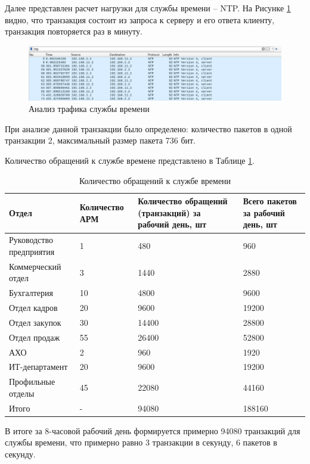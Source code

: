\documentclass[14pt, a4paper]{extarticle}
\numberwithin{equation}{section}
\begin{document}
Далее представлен расчет нагрузки для службы времени -- NTP. На Рисунке \ref{fig:wireshark_ntp_dump} видно, что
транзакция состоит из запроса к серверу и его ответа клиенту, транзакция повторяется
раз в минуту.

\begin{figure}[H]
        \centering
        \includegraphics[scale=0.5]{ntp_wireshark_dump.png}
        \caption{Анализ трафика службы времени}
        \label{fig:wireshark_ntp_dump}
\end{figure}

При анализе данной транзакции было определено: количество пакетов в одной транзакции 2, максимальный размер пакета 736 бит.

Количество обращений к службе времене представлено в Таблице \ref{table:ntp_requests}.
\begin{table}[H]
\centering
\small
\caption{Количество обращений к службе времени}
\label{table:ntp_requests}
\begin{tabular}{|m{3cm}|m{3cm}|m{4cm}|m{3cm}|}
\hline
\textbf{Отдел} & \textbf{Количество АРМ} & \textbf{Количество обращений (транзакций) за рабочий день, шт } & \textbf{Всего пакетов за рабочий день, шт }\\
\hline
Руководство предприятия & 1 & 480 & 960 \\
\hline
Коммерческий отдел & 3 & 1440 & 2880 \\
\hline
Бухгалтерия & 10 & 4800 & 9600 \\
\hline
Отдел кадров & 20 & 9600 & 19200 \\
\hline
Отдел закупок & 30 & 14400 & 28800 \\
\hline
Отдел продаж & 55 & 26400 & 52800 \\
\hline
АХО & 2 & 960 & 1920 \\
\hline
ИТ-департамент & 20 & 9600 & 19200 \\
\hline
Профильные отделы & 45 & 22080 & 44160 \\
\hline
Итого & - & 94080 & 188160 \\
\hline
\end{tabular}
\end{table}

В итоге за 8-часовой рабочий день формируется примерно 94080 транзакций для службы времени, что примерно равно 
3 транзакции в секунду, 6 пакетов в секунду.
\end{document}
